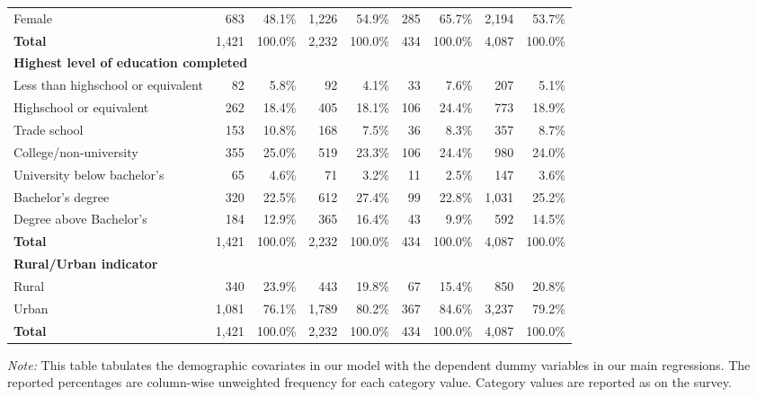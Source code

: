 \documentclass{article}[12pt]
\begin{document}
\begin{table}[h!]
\begin{threeparttable}
\begin{tabular}{lrrrrrrrr}
                Female&683&48.1\%&1,226&54.9\%&285&65.7\%&2,194&53.7\% \\
                \textbf{Total}&1,421&100.0\%&2,232&100.0\%&434&100.0\%&4,087&100.0\% \\
                \hline
                \multicolumn{8}{l}{\bf Highest level of education completed} \\
                Less than highschool or equivalent&82&5.8\%&92&4.1\%&33&7.6\%&207&5.1\% \\
                Highschool or equivalent&262&18.4\%&405&18.1\%&106&24.4\%&773&18.9\% \\
                Trade school&153&10.8\%&168&7.5\%&36&8.3\%&357&8.7\% \\
                College/non-university&355&25.0\%&519&23.3\%&106&24.4\%&980&24.0\% \\
                University below bachelor's&65&4.6\%&71&3.2\%&11&2.5\%&147&3.6\% \\
                Bachelor's degree&320&22.5\%&612&27.4\%&99&22.8\%&1,031&25.2\% \\
                Degree above Bachelor's&184&12.9\%&365&16.4\%&43&9.9\%&592&14.5\% \\
                \textbf{Total}&1,421&100.0\%&2,232&100.0\%&434&100.0\%&4,087&100.0\% \\
                \hline
                \textbf{Rural/Urban indicator}&&&&&&&& \\
                Rural&340&23.9\%&443&19.8\%&67&15.4\%&850&20.8\% \\
                Urban&1,081&76.1\%&1,789&80.2\%&367&84.6\%&3,237&79.2\% \\
                \textbf{Total}&1,421&100.0\%&2,232&100.0\%&434&100.0\%&4,087&100.0\% \\
                \hline
            \end{tabular}
            \begin{tablenotes}
                \item
                \textit{Note:} This table tabulates the demographic covariates in our model with the dependent dummy variables in our main regressions. The reported percentages are column-wise unweighted frequency for each category value. Category values are reported as on the survey.
            \end{tablenotes}
            \label{tab:demo}
            
        \end{threeparttable}
        \end{table}
    
\end{document}
